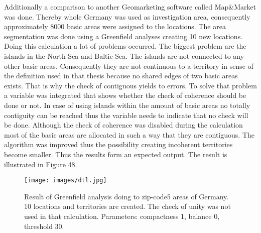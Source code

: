 Additionally a comparison to another Geomarketing software called Map\&Market was done. Thereby whole Germany was used as investigation area, consequently approximately 8000 basic areas were assigned to the locations. The area segmentation was done using a Greenfield analyses creating 10 new locations. Doing this calculation a lot of problems occurred. The biggest problem are the islands in the North Sea and Baltic Sea. The islands are not connected to any other basic areas. Consequently they are not continuous to a territory in sense of the definition used in that thesis because no shared edges of two basic areas exists. That is why the check of contiguous yields to errors. To solve that problem a variable was integrated that shows whether the check of coherence should be done or not. In case of using islands within the amount of basic areas no totally contiguity can be reached thus the variable needs to indicate that no check will be done. Although the check of coherence was disabled during the calculation most of the basic areas are allocated in such a way that they are contiguous. The algorithm was improved thus the possibility creating incoherent territories become smaller. Thus the results form an expected output. The result is illustrated in Figure 48. 

\begin{figure}[H]
	\centering
	\texttt{[image: images/dtl.jpg]}
	\caption[Result of Greenfield analysis doing to zip-code5 areas of Germany.]{Result of Greenfield analysis doing to zip-code5 areas of Germany. 10 locations and territories are created. The check of unity was not used in that calculation. Parameters: compactness 1, balance 0, threshold 30.}
\end{figure}

